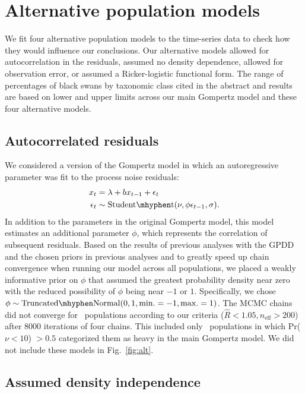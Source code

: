 \section{Alternative population models}

We fit four alternative population models to the time-series data to check how
they would influence our conclusions. Our alternative models allowed for
autocorrelation in the residuals, assumed no density dependence, allowed for
observation error, or assumed a Ricker-logistic functional form. The range of
percentages of black swans by taxonomic class cited in the abstract and
results are based on lower and upper limits across our main Gompertz model and
these four alternative models.

\subsection{Autocorrelated residuals}

We considered a version of the Gompertz model in which an autoregressive
parameter was fit to the process noise residuals:
\begin{align*}
x_t &= \lambda + b x_{t-1} + \epsilon_t\\
\epsilon_t &\sim \mathrm{Student\mhyphen t}(\nu, \phi \epsilon_{t-1}, \sigma).
\end{align*}
In addition to the parameters in the original Gompertz model, this model
estimates an additional parameter $\phi$, which represents the correlation of
subsequent residuals. Based on the results of previous analyses with the GPDD
\citep[e.g.][]{connors2014} and the chosen priors in previous analyses
\citep[e.g.][]{thorson2014a} and to greatly speed up chain convergence when
running our model across all populations, we placed a weakly informative prior
on $\phi$ that assumed the greatest probability density near zero with the
reduced possibility of $\phi$ being near $-1$ or $1$. Specifically, we chose
$\phi \sim \mathrm{Truncated\mhyphen Normal}(0, 1, \mathrm{min.} = -1,
\mathrm{max.} = 1)$. The MCMC chains did not converge for
\modelsNoConvergeAROne\ populations according to our criteria ($\widehat{R} <
1.05, n_\mathrm{eff} > 200$) after 8000 iterations of four chains. This
  included only \modelsNoConvergeAROneHeavyBase\ populations in which Pr($\nu
  < 10$) $> 0.5$ categorized them as heavy in the main Gompertz model. We did
  not include these models in Fig.~\ref{fig:alt}.

\subsection{Assumed density independence}\label{assumed-density-independence}

